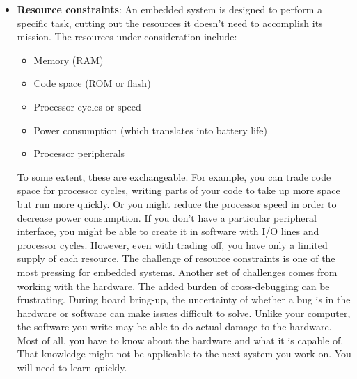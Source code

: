 \documentclass{report}
\begin{document}
\begin{itemize}
            \bigbreak \noindent 
            To avoid buying a debugger or dealing with the processor limitations, many embedded systems are designed to have their debugging done primarily via printf or some sort of lighter-weight logging to an otherwise unused communication port. Although incredibly useful, this can also change the timing of the system, possibly leaving some bugs to be revealed only after debugging output is turned off.
            \bigbreak \noindent 
            Writing software for an embedded system can be tricky, as you have to balance the needs of the system and the constraints of the hardware.
        \item \textbf{Resource constraints}: An embedded system is designed to perform a specific task, cutting out the resources it doesn’t need to accomplish its mission. The resources under consideration include:
            \begin{itemize}
                \item Memory (RAM)
                \item Code space (ROM or flash)
                \item Processor cycles or speed
                \item Power consumption (which translates into battery life)
                \item Processor peripherals
            \end{itemize}
            To some extent, these are exchangeable. For example, you can trade code space for processor cycles, writing parts of your code to take up more space but run more quickly. Or you might reduce the processor speed in order to decrease power consumption. If you don’t have a particular peripheral interface, you might be able to create it in software with I/O lines and processor cycles. However, even with trading off, you have only a limited supply of each resource. The challenge of resource constraints is one of the most pressing for embedded systems.
            \bigbreak \noindent 
            Another set of challenges comes from working with the hardware. The added burden of cross-debugging can be frustrating. During board bring-up, the uncertainty of whether a bug is in the hardware or software can make issues difficult to solve. Unlike your computer, the software you write may be able to do actual damage to the hardware. Most of all, you have to know about the hardware and what it is capable of. That knowledge might not be applicable to the next system you work on. You will need to learn quickly.
            \bigbreak \noindent 

\end{itemize}
\end{document}
